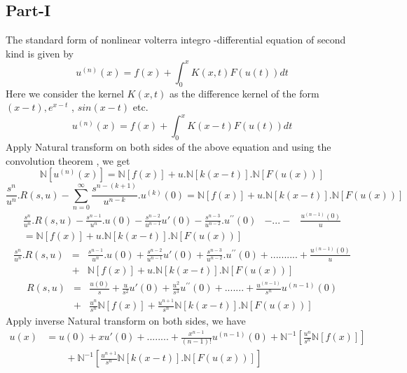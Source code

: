 \subsection{Part-I}
The standard form of nonlinear volterra integro -differential equation of second kind is given by\cite{R92}
\begin{equation}
{u^{(n)}(x)=f(x)+\int_{0}^{x}K(x,t)F(u(t))dt }
\end{equation}
Here we consider the  kernel $K(x,t)$ as the difference kernel of the form $(x-t),e^{x-t}$ , $sin(x-t)$ etc.
\begin{equation}
{u^{(n)}(x)=f(x)+\int_{0}^{x}K(x-t)F(u(t))dt }
\end{equation}
Apply Natural transform on both sides of the above equation  and using the convolution theorem , we get
\begin{equation}
{\mathbb{N}[u^{(n)}(x)]= \mathbb{N}[f(x)] + u.\mathbb{N}[k(x-t)].\mathbb{N}[F(u(x))]}
\end{equation}
\begin{equation*}
{ \frac{s^{n}}{u^{n}}.R(s,u) - { \sum_{n=0}^{\infty} \frac{s^{n-(k+1)}}{u^{n-k}}.u^{(k)}(0)}= \mathbb{N}[f(x)] + u.\mathbb{N}[k(x-t)].\mathbb{N}[F(u(x))]}
\end{equation*}
\begin{align*}
 \frac{s^{n}}{u^{n}}.R(s,u) - \frac{s^{n-1}}{u^{n}}.u(0) - \frac{s^{n-2}}{u^{n-1}}u'(0)
 - \frac{s^{n-3}}{u^{n-2}}.u^{\prime\prime}(0) 
 &-...-&\frac{u^{(n-1)}(0)}{u}\\
 =\mathbb{N}[f(x)]+ u.\mathbb{N}[k(x-t)].\mathbb{N}[F(u(x))]
\end{align*}
\begin{eqnarray*}
\frac{s^{n}}{u^{n}}.R(s,u)& =& \frac{s^{n-1}}{u^{n}}.u(0) + \frac{s^{n-2}}{u^{n-1}}u'(0) + \frac{s^{n-3}}{u^{n-2}}.u^{\prime\prime}(0) + ..........+ \frac{u^{(n-1)}(0)}{u} \\
&+& \mathbb{N}[f(x)] + u.\mathbb{N}[k(x-t)].\mathbb{N}[F(u(x))] 
\end{eqnarray*}
\begin{eqnarray*}
R(s,u)& = &\frac{u(0)}{s} + \frac{u}{s^2}u'(0) + \frac{u^2}{s^3}u^{\prime\prime}(0) + ....... +\frac{u^{(n-1)}}{s^n}u^{(n-1)}(0) \\
&+ &\frac{u^n}{s^n} \mathbb{N}[f(x)] + \frac{u^{n+1}}{s^n}\mathbb{N}[k(x-t)].\mathbb{N}[F(u(x))] 
\end{eqnarray*}
Apply inverse Natural transform on both sides, we have
\begin{align}
u(x)& = u(0) + x u'(0) + ........+ \frac{x^{n-1}}{(n-1)!}u^{(n-1)}(0) + \mathbb{N}^{-1}[\frac{u^n}{s^n} \mathbb{N}[f(x)]]\nonumber \\
&\qquad + \mathbb{N}^{-1}[\frac{u^{n+1}}{s^n} \mathbb{N}[k(x-t)].\mathbb{N}[F(u(x))]] 
\end{align}
